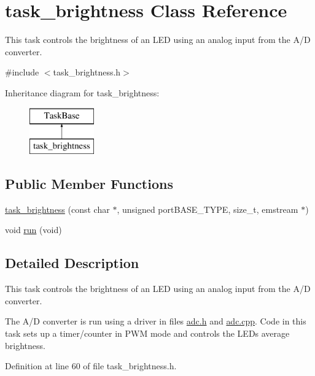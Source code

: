 \hypertarget{classtask__brightness}{}\section{task\+\_\+brightness Class Reference}
\label{classtask__brightness}


This task controls the brightness of an L\+ED using an analog input from the A/D converter.  




{\ttfamily \#include $<$task\+\_\+brightness.\+h$>$}

Inheritance diagram for task\+\_\+brightness\+:\begin{figure}[H]
\begin{center}
\leavevmode
\includegraphics[height=2.000000cm]{classtask__brightness}
\end{center}
\end{figure}
\subsection*{Public Member Functions}
\begin{DoxyCompactItemize}
\item 
\hyperlink{classtask__brightness_a5802baf3a0c9fe53ccbce8966d1fad47}{task\+\_\+brightness} (const char $\ast$, unsigned port\+B\+A\+S\+E\+\_\+\+T\+Y\+PE, size\+\_\+t, emstream $\ast$)
\item 
void \hyperlink{classtask__brightness_a615beac07a99f0856f048a46fd9a3898}{run} (void)
\end{DoxyCompactItemize}


\subsection{Detailed Description}
This task controls the brightness of an L\+ED using an analog input from the A/D converter. 

The A/D converter is run using a driver in files {\ttfamily \hyperlink{adc_8h}{adc.\+h}} and {\ttfamily \hyperlink{adc_8cpp}{adc.\+cpp}}. Code in this task sets up a timer/counter in P\+WM mode and controls the L\+ED\textquotesingle{}s average brightness. 

Definition at line 60 of file task\+\_\+brightness.\+h.




